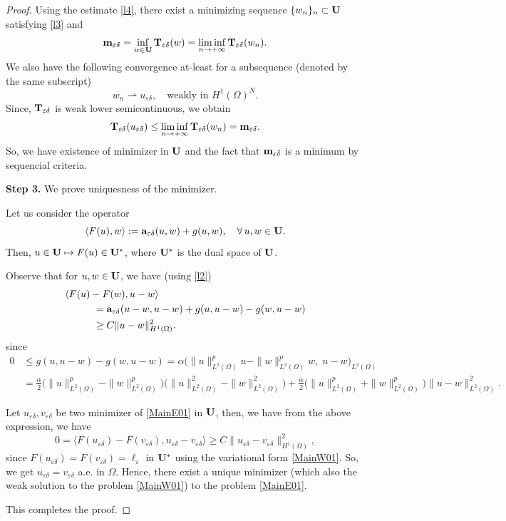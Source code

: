 \documentclass[10pt,a4paper]{amsart}
\def\GT{{\bf T}}
\def\GU{{\bf U}}
\def\Ga{{\bf a}}
\def\Gm{{\bf m}}
\def\O{\Omega}
\def\d{\delta}
\def\ed{{\varepsilon\delta}}
\def\e{\varepsilon}
\begin{document}
\begin{proof}
	Using the estimate \eqref{l4}, there exist a minimizing sequence $\{w_n\}_n\subset \GU$ satisfying \eqref{l3} and
	$$\Gm_\ed=\inf_{w\in\GU}\GT_\ed(w)=\liminf_{n\to+\infty}\GT_\ed(w_n).$$
	We also have the following convergence at-least for a subsequence (denoted by the same subscript)
	$$w_n\rightharpoonup u_\ed,\quad\text{weakly in $H^1(\O)^N$}.$$
	Since, $\GT_\ed$ is weak lower semicontinuous, we obtain
	$$\GT_\ed(u_\ed)\leq \liminf_{n\to+\infty}\GT_\ed(w_n)=\Gm_\ed.$$
	So, we have existence of  minimizer in $\GU$ and the fact that $\Gm_\ed$ is a minimum by sequencial criteria.
	
	{\bf Step 3.} We prove uniquesness of the minimizer.
	
	Let us consider the operator 
	$$\langle F(u),w\rangle:=\Ga_\ed(u,w)+g(u,w),\quad\forall\,u,w\in\GU.$$
	Then, $u\in\GU\mapsto F(u)\in\GU^\ast$, where $\GU^\ast$ is the dual space of $\GU$.
	
	Observe that for $u,w\in\GU$, we have (using \eqref{l2})
	\begin{align*}
		&\langle F(u)-F(w),u-w\rangle\\
		&\hskip1cm=\Ga_\ed(u-w,u-w)+g(u,u-w)-g(w,u-w)\\
		&\hskip 1cm \geq C\|u-w\|^2_{H^1(\O)}.
	\end{align*}
	since
	\begin{align*}
		0 &\le g(u,u-w)-g(w,u-w)
		= \alpha\big(\|u\|_{L^2(\Omega)}^{p}u-\|w\|_{L^2(\Omega)}^{p}w,\;u-w\big)_{L^2(\Omega)}\\
		&=\frac{\alpha}{2}\Big(\|u\|_{L^2(\Omega)}^{p}-\|w\|_{L^2(\Omega)}^{p}\Big)
		\Big(\|u\|_{L^2(\Omega)}^{2}-\|w\|_{L^2(\Omega)}^{2}\Big)
		+\frac{\alpha}{2}\Big(\|u\|_{L^2(\Omega)}^{p}+\|w\|_{L^2(\Omega)}^{p}\Big)
		\|u-w\|_{L^2(\Omega)}^{2}.
	\end{align*}
	
	Let $u_\ed,v_\ed$ be two minimizer of \eqref{MainE01} in $\GU$, then, we have from the above expression, we have
	\begin{equation*}
		0=\langle F(u_\ed)-F(v_\ed),u_\ed-v_\ed\rangle\geq C\|u_\ed-v_\ed\|^2_{H^1(\O)},
	\end{equation*}
	since $F(u_\ed)=F(v_\ed)=\ell_\e$ in $\GU^\ast$ using the variational form \eqref{MainW01}. So, we get $u_\ed=v_\ed$ a.e. in $\O$. Hence, there exist a unique minimizer (which also the weak solution to the problem \eqref{MainW01}) to the problem \eqref{MainE01}.
	
	This completes the proof.
\end{proof}	
\end{document}
